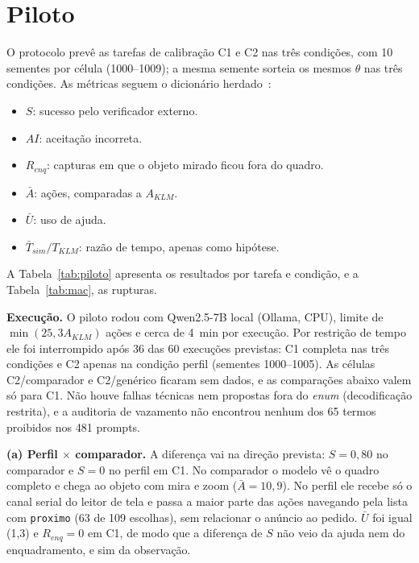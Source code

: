 \documentclass[conference]{IEEEtran}
\begin{document}
\section{Piloto}
O protocolo prevê as tarefas de calibração C1 e C2 nas três condições, com 10 sementes por célula (1000--1009); a mesma semente sorteia os mesmos $\theta$ nas três condições. As métricas seguem o dicionário herdado~\cite{alinhamento}:
\begin{itemize}
\item $S$: sucesso pelo verificador externo.
\item $AI$: aceitação incorreta.
\item $R_{enq}$: capturas em que o objeto mirado ficou fora do quadro.
\item $\bar A$: ações, comparadas a $A_{KLM}$.
\item $\bar U$: uso de ajuda.
\item $\bar T_{sim}/T_{KLM}$: razão de tempo, apenas como hipótese.
\end{itemize}
A Tabela~\ref{tab:piloto} apresenta os resultados por tarefa e condição, e a Tabela~\ref{tab:mac}, as rupturas.

\begin{table}[t]
\caption{Resultados do piloto (dados SINTÉTICOS; calibração).}
\label{tab:piloto}
\centering\scriptsize\setlength{\tabcolsep}{2.6pt}

\end{table}

\begin{table}[t]
\caption{Rupturas MAC detectadas por assinatura no log.}
\label{tab:mac}
\centering\scriptsize\setlength{\tabcolsep}{2pt}

\end{table}

\textbf{Execução.} O piloto rodou com Qwen2.5-7B local (Ollama, CPU), limite de $\min(25, 3A_{KLM})$ ações e cerca de 4~min por execução. Por restrição de tempo ele foi interrompido após 36 das 60 execuções previstas: C1 completa nas três condições e C2 apenas na condição perfil (sementes 1000--1005). As células C2/comparador e C2/genérico ficaram sem dados, e as comparações abaixo valem só para C1. Não houve falhas técnicas nem propostas fora do \emph{enum} (decodificação restrita), e a auditoria de vazamento não encontrou nenhum dos 65 termos proibidos nos 481 prompts.

\textbf{(a) Perfil $\times$ comparador.} A diferença vai na direção prevista: $S=0{,}80$ no comparador e $S=0$ no perfil em C1. No comparador o modelo vê o quadro completo e chega ao objeto com mira e zoom ($\bar A=10{,}9$). No perfil ele recebe só o canal serial do leitor de tela e passa a maior parte das ações navegando pela lista com \texttt{proximo} (63 de 109 escolhas), sem relacionar o anúncio ao pedido. $\bar U$ foi igual (1{,}3) e $R_{enq}=0$ em C1, de modo que a diferença de $S$ não veio da ajuda nem do enquadramento, e sim da observação.
\end{document}

